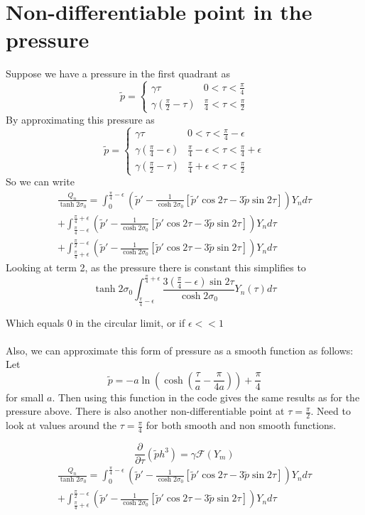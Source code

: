 \documentclass[12pt]{article}
\begin{document}
\section{Non-differentiable point in the pressure}
Suppose we have a pressure in the first quadrant as 
$$\tilde{p}=\begin{cases}
\gamma\tau & 0<\tau<\frac{\pi}{4} \\ 
\gamma(\frac{\pi}{2}-\tau) & \frac{\pi}{4}<\tau<\frac{\pi}{2} 
\end{cases}$$
By approximating this pressure as $$\tilde{p}=\begin{cases}
\gamma\tau & 0<\tau<\frac{\pi}{4}-\epsilon \\ 
\gamma(\frac{\pi}{4}-\epsilon) & \frac{\pi}{4}-\epsilon<\tau<\frac{\pi}{4}+\epsilon \\
\gamma(\frac{\pi}{2}-\tau) & \frac{\pi}{4}+\epsilon<\tau<\frac{\pi}{2} 
\end{cases}$$
So we can write
\begin{align*}
\frac{Q_n}{\tanh 2\sigma_0}= \int_0^{\frac{\pi}{4}-\epsilon} \left(\tilde{p}'-\frac{1}{\cosh 2\sigma_0}\left[\tilde{p}'\cos 2\tau - 3\tilde{p}\sin 2\tau\right]\right) Y_n d\tau
\\ + \int_{\frac{\pi}{4}-\epsilon}^{\frac{\pi}{4}+\epsilon} \left(\tilde{p}'-\frac{1}{\cosh 2\sigma_0}\left[\tilde{p}'\cos 2\tau - 3\tilde{p}\sin 2\tau\right]\right) Y_n d\tau 
\\ + \int_{\frac{\pi}{4}+\epsilon}^{\frac{\pi}{2}-\epsilon} \left(\tilde{p}'-\frac{1}{\cosh 2\sigma_0}\left[\tilde{p}'\cos 2\tau - 3\tilde{p}\sin 2\tau\right]\right) Y_n d\tau 
\end{align*}
Looking at term 2, as the pressure there is constant this simplifies to 
$$  \tanh 2\sigma_0 \int_{\frac{\pi}{4}-\epsilon}^{\frac{\pi}{4}+\epsilon} \frac{3(\frac{\pi}{4}-\epsilon)\sin 2\tau}{\cosh 2\sigma_0}Y_n(\tau)d\tau$$

Which equals 0 in the circular limit, or if $\epsilon<<1$
\\
\\ Also, we can approximate this form of pressure as a smooth function as follows:
\\ Let $$\tilde{p}=-a\ln(\cosh(\frac{\tau}{a}-\frac{\pi}{4a}))+\frac{\pi}{4}$$ for small $a$. Then using this function in the code gives the same results as for the pressure above. There is also another non-differentiable point at $\tau=\frac{\pi}{2}$. Need to look at values around the $\tau=\frac{\pi}{4}$ for both smooth and non smooth functions.


$$\frac{\partial}{\partial \tau}(\tilde{p}h^3)=\gamma\mathscr{F}(Y_m)$$
\begin{align*}
\frac{Q_n}{\tanh 2\sigma_0}= \int_0^{\frac{\pi}{4}-\epsilon} \left(\tilde{p}'-\frac{1}{\cosh 2\sigma_0}\left[\tilde{p}'\cos 2\tau - 3\tilde{p}\sin 2\tau\right]\right) Y_n d\tau
\\ + \int_{\frac{\pi}{4}+\epsilon}^{\frac{\pi}{2}-\epsilon} \left(\tilde{p}'-\frac{1}{\cosh 2\sigma_0}\left[\tilde{p}'\cos 2\tau - 3\tilde{p}\sin 2\tau\right]\right) Y_n d\tau 
\end{align*}
\end{document}
